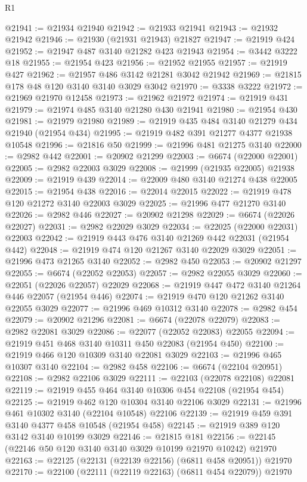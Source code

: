 \begin{lexlean}{R1}
\begin{coremodule}
@21941 := @21934 @21940
@21942 := @21933 @21941
@21943 := @21932 @21942
@21946 := @21930 (@21931 @21943) @21827
@21947 := @21919 @424
@21952 := @21947 @487 @3140 @21282 @423 @21943
@21954 := @3442 @3222 @18
@21955 := @21954 @423
@21956 := @21952 @21955
@21957 := @21919 @427
@21962 := @21957 @486 @3142 @21281 @3042 @21942
@21969 := @21815 @178 @48 @120 @3140 @3140 @3029 @3042
@21970 := @3338 @3222
@21972 := @21969 @21970 @12458
@21973 := @21962 @21972
@21974 := @21919 @431
@21979 := @21974 @485 @3140 @21280 @430 @21941
@21980 := @21954 @430
@21981 := @21979 @21980
@21989 := @21919 @435 @484 @3140 @21279 @434 @21940 (@21954 @434)
@21995 := @21919 @482 @391 @21277 @4377 @21938 @10548
@21996 := @21816 @50
@21999 := @21996 @481 @21275 @3140
@22000 := @2982 @442
@22001 := @20902 @21299
@22003 := @6674 (@22000 @22001)
@22005 := @2982 @22003 @3029
@22008 := @21999 (@21935 @22005) @21938
@22009 := @21919 @439
@22014 := @22009 @480 @3140 @21274 @438 @22005
@22015 := @21954 @438
@22016 := @22014 @22015
@22022 := @21919 @478 @120 @21272 @3140 @22003 @3029
@22025 := @21996 @477 @21270 @3140
@22026 := @2982 @446
@22027 := @20902 @21298
@22029 := @6674 (@22026 @22027)
@22031 := @2982 @22029 @3029
@22034 := @22025 (@22000 @22031) @22003
@22042 := @21919 @443 @476 @3140 @21269 @442 @22031 (@21954 @442)
@22048 := @21919 @474 @120 @21267 @3140 @22029 @3029
@22051 := @21996 @473 @21265 @3140
@22052 := @2982 @450
@22053 := @20902 @21297
@22055 := @6674 (@22052 @22053)
@22057 := @2982 @22055 @3029
@22060 := @22051 (@22026 @22057) @22029
@22068 := @21919 @447 @472 @3140 @21264 @446 @22057 (@21954 @446)
@22074 := @21919 @470 @120 @21262 @3140 @22055 @3029
@22077 := @21996 @469 @10312 @3140
@22078 := @2982 @454
@22079 := @20902 @21296
@22081 := @6674 (@22078 @22079)
@22083 := @2982 @22081 @3029
@22086 := @22077 (@22052 @22083) @22055
@22094 := @21919 @451 @468 @3140 @10311 @450 @22083 (@21954 @450)
@22100 := @21919 @466 @120 @10309 @3140 @22081 @3029
@22103 := @21996 @465 @10307 @3140
@22104 := @2982 @458
@22106 := @6674 (@22104 @20951)
@22108 := @2982 @22106 @3029
@22111 := @22103 (@22078 @22108) @22081
@22119 := @21919 @455 @464 @3140 @10306 @454 @22108 (@21954 @454)
@22125 := @21919 @462 @120 @10304 @3140 @22106 @3029
@22131 := @21996 @461 @10302 @3140 (@22104 @10548) @22106
@22139 := @21919 @459 @391 @3140 @4377 @458 @10548 (@21954 @458)
@22145 := @21919 @389 @120 @3142 @3140 @10199 @3029
@22146 := @21815 @181
@22156 := @22145 (@22146 @50 @120 @3140 @3140 @3029 @10199 @21970 @10242) @21970
@22163 := @22125 (@22131 (@22139 @22156) (@6811 @458 @20951)) @21970
@22170 := @22100 (@22111 (@22119 @22163) (@6811 @454 @22079)) @21970

\end{coremodule}
\end{lexlean}
